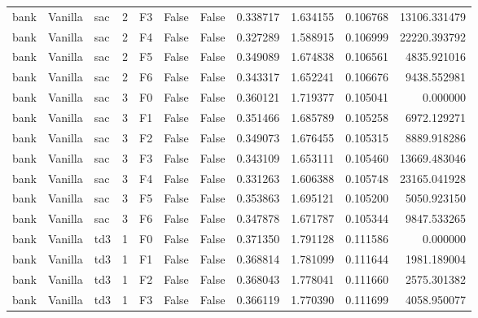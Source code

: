 \begin{tabular}{lllrlllrrrr}
      bank & Vanilla &       sac &     2 &  F3 &           False &            False &  0.338717 &  1.634155 & 0.106768 &     13106.331479 \\
      bank & Vanilla &       sac &     2 &  F4 &           False &            False &  0.327289 &  1.588915 & 0.106999 &     22220.393792 \\
      bank & Vanilla &       sac &     2 &  F5 &           False &            False &  0.349089 &  1.674838 & 0.106561 &      4835.921016 \\
      bank & Vanilla &       sac &     2 &  F6 &           False &            False &  0.343317 &  1.652241 & 0.106676 &      9438.552981 \\
      bank & Vanilla &       sac &     3 &  F0 &           False &            False &  0.360121 &  1.719377 & 0.105041 &         0.000000 \\
      bank & Vanilla &       sac &     3 &  F1 &           False &            False &  0.351466 &  1.685789 & 0.105258 &      6972.129271 \\
      bank & Vanilla &       sac &     3 &  F2 &           False &            False &  0.349073 &  1.676455 & 0.105315 &      8889.918286 \\
      bank & Vanilla &       sac &     3 &  F3 &           False &            False &  0.343109 &  1.653111 & 0.105460 &     13669.483046 \\
      bank & Vanilla &       sac &     3 &  F4 &           False &            False &  0.331263 &  1.606388 & 0.105748 &     23165.041928 \\
      bank & Vanilla &       sac &     3 &  F5 &           False &            False &  0.353863 &  1.695121 & 0.105200 &      5050.923150 \\
      bank & Vanilla &       sac &     3 &  F6 &           False &            False &  0.347878 &  1.671787 & 0.105344 &      9847.533265 \\
      bank & Vanilla &       td3 &     1 &  F0 &           False &            False &  0.371350 &  1.791128 & 0.111586 &         0.000000 \\
      bank & Vanilla &       td3 &     1 &  F1 &           False &            False &  0.368814 &  1.781099 & 0.111644 &      1981.189004 \\
      bank & Vanilla &       td3 &     1 &  F2 &           False &            False &  0.368043 &  1.778041 & 0.111660 &      2575.301382 \\
      bank & Vanilla &       td3 &     1 &  F3 &           False &            False &  0.366119 &  1.770390 & 0.111699 &      4058.950077 \\

\end{tabular}
